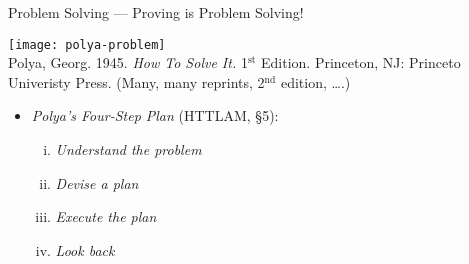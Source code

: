 \begin{frame}{Problem Solving --- Proving is Problem Solving!}

\begin{center}
		\texttt{[image: polya-problem]}\\
		Polya, Georg. 1945. \emph{How To Solve It.} 1$^\text{st}$ Edition. Princeton, NJ: Princeto Univeristy Press. (Many, many reprints, 2$^\text{nd}$ edition, \dots.)
		\end{center}

	\begin{itemize}
		
		\item \emph{Polya's Four-Step Plan} (HTTLAM, \S5):
		
			\begin{enumerate}[(i)]
			
				\item \emph{Understand the problem}
				
					
				
				\item \emph{Devise a plan}
				
					
				
				\item \emph{Execute the plan}
				
				
				
				\item \emph{Look back}
			
			\end{enumerate}

	\end{itemize}
	
\end{frame}

